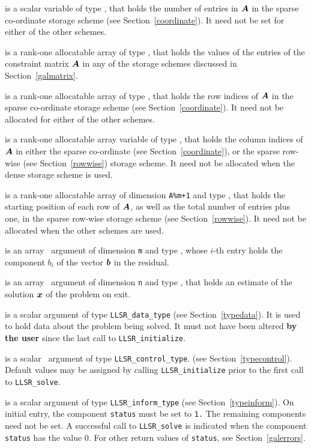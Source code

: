 \documentclass{galahad}
\newcommand{\packagename}{LLSR}
\begin{document}
\begin{description}
\begin{description}
 is a scalar variable of type \integer, that
holds the number of entries in ${\bm{A}}$
in the sparse co-ordinate storage scheme (see Section~\ref{coordinate}).
It need not be set for either of the other schemes.

 is a rank-one allocatable array of type \realdp, that holds
the values of the entries of the constraint matrix ${\bm{A}}$ in any of the
storage schemes discussed in Section~\ref{galmatrix}.

 is a rank-one allocatable array of type \integer,
that holds the row indices of ${\bm{A}}$ in the sparse co-ordinate storage
scheme (see Section~\ref{coordinate}).
It need not be allocated for either of the other schemes.

 is a rank-one allocatable array variable of type \integer,
that holds the column indices of ${\bm{A}}$ in either the sparse co-ordinate
(see Section~\ref{coordinate}), or the sparse row-wise
(see Section~\ref{rowwise}) storage scheme.
It need not be allocated when the dense storage scheme is used.

 is a rank-one allocatable array of dimension {\tt A\%m+1} and type
\integer, that holds the starting position of
each row of ${\bm{A}}$, as well
as the total number of entries plus one, in the sparse row-wise storage
scheme (see Section~\ref{rowwise}). It need not be allocated when the
other schemes are used.
\end{description}

 is an array \intentin\ argument of dimension {\tt m} and
type \realdp,  whose $i$-th entry holds the component $b_i$ of
the vector ${\bm{b}}$ in the residual.

 is an array \intentout\ argument of dimension {\tt n} and
type \realdp, that holds an estimate of the solution ${\bm{x}}$
of the problem on exit.

 is a scalar \intentinout argument of type
{\tt \packagename\_data\_type}
(see Section~\ref{typedata}). It is used to hold data about the problem being
solved. It must not have been altered {\bf by the user} since the last call to
{\tt \packagename\_initialize}.

 is a scalar \intentin\ argument of type
{\tt \packagename\_control\_type}.
(see Section~\ref{typecontrol}).
Default values may be assigned by calling {\tt \packagename\_initialize}
prior to the first call to {\tt \packagename\_solve}.

 is a scalar \intentinout argument of type
{\tt \packagename\_inform\_type}
(see Section~\ref{typeinform}).
On initial entry, the component {\tt status} must be set to {\tt 1.}
The remaining components need not be set.
A successful call to
{\tt \packagename\_solve}
is indicated when the  component {\tt status} has the value 0.
For other return values of {\tt status}, see Section~\ref{galerrors}.


\end{description}
\end{document}

